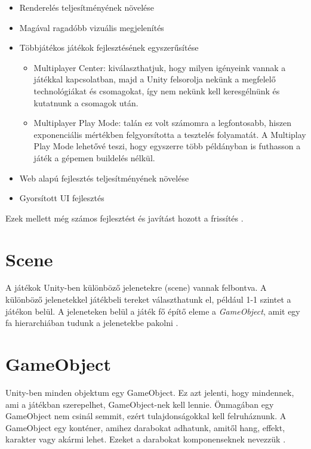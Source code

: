 \documentclass[]{thesis-ekf}
\theoremstyle{definition}
\theoremstyle{remark}
\begin{document}
\begin{itemize}
	\item Renderelés teljesítményének növelése
	\item Magával ragadóbb vizuális megjelenítés
	\item Többjátékos játékok fejlesztésének egyszerűsítése
	\begin{itemize}
		\item Multiplayer Center: kiválaszthatjuk, hogy milyen igényeink vannak a játékkal kapcsolatban, majd a Unity felsorolja nekünk a megfelelő technológiákat és csomagokat, így nem nekünk kell keresgélnünk és kutatnunk a csomagok után.
		\item Multiplayer Play Mode: talán ez volt számomra a legfontosabb, hiszen exponenciális mértékben felgyorsította a tesztelés folyamatát. A Multiplay Play Mode lehetővé teszi, hogy egyszerre több példányban is futhasson a játék a gépemen buildelés nélkül.
	\end{itemize}
	\item Web alapú fejlesztés teljesítményének növelése
	\item Gyorsított UI fejlesztés
\end{itemize}

Ezek mellett még számos fejlesztést és javítást hozott a frissítés \cite{Unity6Features}.

\section{Scene}

A játékok Unity-ben különböző jelenetekre (scene) vannak felbontva. A különböző jelenetekkel játékbeli tereket választhatunk el, például 1-1 szintet a játékon belül. A jeleneteken belül a játék fő építő eleme a \emph{GameObject}, amit egy fa hierarchiában tudunk a jelenetekbe pakolni \cite{UnityScene}.

\section{GameObject}
\label{sec-gameobject}

Unity-ben minden objektum egy GameObject. Ez azt jelenti, hogy mindennek, ami a játékban szerepelhet, GameObject-nek kell lennie. Önmagában egy GameObject nem csinál semmit, ezért tulajdonságokkal kell felruháznunk. A GameObject egy konténer, amihez darabokat adhatunk, amitől hang, effekt, karakter vagy akármi lehet. Ezeket a darabokat komponenseknek nevezzük \cite{UnityGameObjects}.
\end{document}
